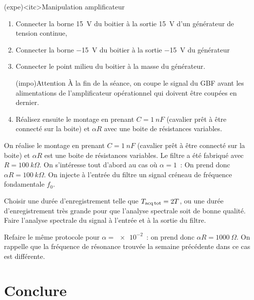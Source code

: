 \documentclass[../main/main.tex]{subfiles}
\begin{document}
\begin{tcb}(expe)<itc>{Manipulation amplificateur}
	\begin{enumerate}
		\item Connecter la borne \SI{+15}{V} du boitier à la sortie \SI{+15}{V} d'un
		      générateur de tension continue,
		\item Connecter la borne \SI{-15}{V} du boitier à la sortie
		      \SI{-15}{V} du générateur
		\item Connecter le point milieu du boitier à la masse du
		      générateur.
		      \begin{center}
			      \begin{tcb}[cnt,bld,width=.9\linewidth](impo){Attention}
				      À la fin de la séance, on coupe le signal du GBF avant les
				      alimentations de l'amplificateur opérationnel qui doivent être
				      coupées en dernier.
			      \end{tcb}
		      \end{center}
		\item Réalisez ensuite le montage en prenant $C=\SI{1}{nF}$ (cavalier prêt à
		      être connecté sur la boite) et $\alpha R$ avec une boite de résistances
		      variables.
	\end{enumerate}
\end{tcb}

On réalise le montage en prenant $C=\SI{1}{nF}$ (cavalier prêt à être connecté
sur la boite) et $\alpha R$ est une boite de résistances variables. Le filtre a
été fabriqué avec $R= \SI{100}{k\Omega}$.
\bigbreak
On s'intéresse tout d'abord au cas où $\alpha= 1$~: On prend donc $\alpha R =
	\SI{100}{k\Omega}$. On injecte à l'entrée du filtre un signal créneau de
fréquence fondamentale $f_0$.

Choisir une durée d'enregistrement telle que $T_{\rm acq\, tot} = 2 T$, ou une
durée d'enregistrement très grande pour que l'analyse spectrale soit de bonne
qualité. Faire l'analyse spectrale du signal à l'entrée et à la sortie du
filtre.


Refaire le même protocole pour $\alpha=\num{e-2}$~: on prend donc $\alpha R =
	\SI{1000}{\Omega}$. On rappelle que la fréquence de résonance trouvée la semaine
précédente dans ce cas est différente.


\section{Conclure}

\end{document}
